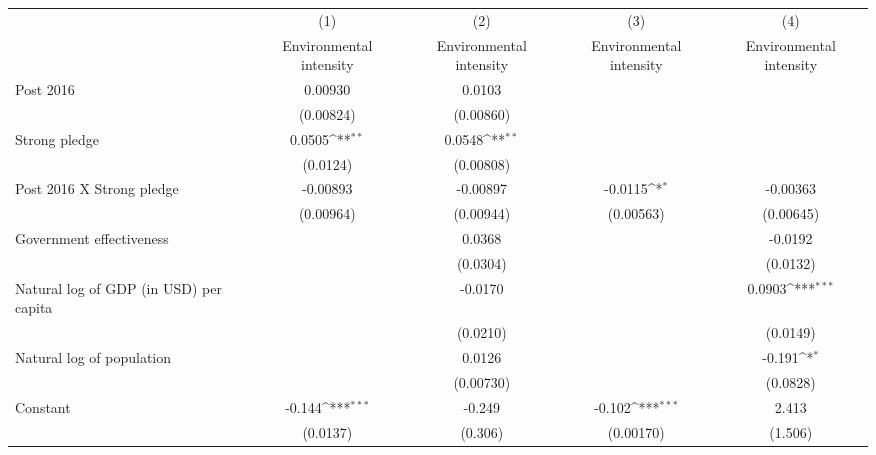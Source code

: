 {
\def\sym#1{\ifmmode^{#1}\else\(^{#1}\)\fi}
\begin{tabular}{l*{4}{c}}
\hline\hline
                    &\multicolumn{1}{c}{(1)}&\multicolumn{1}{c}{(2)}&\multicolumn{1}{c}{(3)}&\multicolumn{1}{c}{(4)}\\
                    &\multicolumn{1}{c}{Environmental intensity}&\multicolumn{1}{c}{Environmental intensity}&\multicolumn{1}{c}{Environmental intensity}&\multicolumn{1}{c}{Environmental intensity}\\
\hline
Post 2016           &     0.00930         &      0.0103         &                     &                     \\
                    &   (0.00824)         &   (0.00860)         &                     &                     \\
[1em]
Strong pledge       &      0.0505\sym{**} &      0.0548\sym{**} &                     &                     \\
                    &    (0.0124)         &   (0.00808)         &                     &                     \\
[1em]
Post 2016 X Strong pledge&    -0.00893         &    -0.00897         &     -0.0115\sym{*}  &    -0.00363         \\
                    &   (0.00964)         &   (0.00944)         &   (0.00563)         &   (0.00645)         \\
[1em]
Government effectiveness&                     &      0.0368         &                     &     -0.0192         \\
                    &                     &    (0.0304)         &                     &    (0.0132)         \\
[1em]
Natural log of GDP (in USD) per capita&                     &     -0.0170         &                     &      0.0903\sym{***}\\
                    &                     &    (0.0210)         &                     &    (0.0149)         \\
[1em]
Natural log of population&                     &      0.0126         &                     &      -0.191\sym{*}  \\
                    &                     &   (0.00730)         &                     &    (0.0828)         \\
[1em]
Constant            &      -0.144\sym{***}&      -0.249         &      -0.102\sym{***}&       2.413         \\
                    &    (0.0137)         &     (0.306)         &   (0.00170)         &     (1.506)         \\

\end{tabular}}
